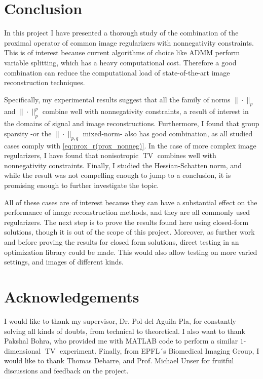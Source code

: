 \section{Conclusion} \label{sect:Conclusion}
In this project I have presented a thorough study of the combination of the proximal operator of common image regularizers with nonnegativity constraints. This is of interest because current algorithms of choice like ADMM perform variable splitting, which has a heavy computational cost. Therefore a good combination can reduce the computational load of state-of-the-art image reconstruction techniques. 

Specifically, my experimental results suggest that all the family of norms $\|\cdot\|_p$ and $\|\cdot\|_p^p$ combine well with nonnegativity constraints, a result of interest in the domains of signal and image reconstructions. Furthermore, I found that group sparsity -or the $\|\cdot\|_{p, q}$ mixed-norm- also has good combination, as all studied cases comply with  \eqref{eq:prox_r(prox_nonneg)}. In the case of more complex image regularizers, I have found that nonisotropic $\operatorname{TV}$ combines well with nonnegativity constraints. Finally, I studied the Hessian-Schatten norm, and while the result was not compelling enough to jump to a conclusion, it is promising enough to further investigate the topic.


All of these cases are of interest because they can have a substantial effect on the performance of image reconstruction methods, and they are all commonly used regularizers. The next step is to prove the results found here using closed-form solutions, though it is out of the scope of this project. Moreover, as further work and before proving the results for closed form solutions, direct testing in an optimization library could be made. This would also allow testing on more varied settings, and images of different kinds.

\section{Acknowledgements} \label{sect:acknowledgements}
I would like to thank my supervisor, Dr. Pol del Aguila Pla, for constantly solving all kinds of doubts, from technical to theoretical. I also want to thank Pakshal Bohra, who provided me with MATLAB code to perform a similar $1$-dimensional $\operatorname{TV}$ experiment. Finally, from EPFL´s Biomedical Imaging Group, I would like to thank Thomas Debarre, and Prof. Michael Unser for fruitful discussions and feedback on the project.
